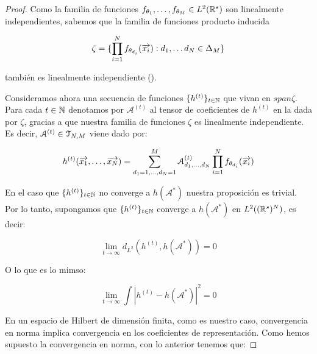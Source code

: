 \begin{proof}
    Como la familia de funciones $f_{\theta_1}, \ldots, f_{\theta_M} \in L^2(\mathbb{R}^s)$ son linealmente independientes, sabemos que la familia de funciones producto inducida

    \begin{equation}
        \zeta = \{ \prod_{i = 1}^N f_{\theta_{d_i}}(\overrightarrow{x_i}): d_1, \ldots d_N \in \Delta_{M} \}
    \end{equation}

    también es linealmente independiente ().

    Consideramos ahora una secuencia de funciones $\{ h^{(t)} \}_{t \in \mathbb{N}}$ que vivan en $span \zeta$. Para cada $t \in \mathbb{N}$ denotamos por $\mathcal{A}^{(t)}$ al tensor de coeficientes de $h^{(t)}$ en la  dada por $\zeta$, gracias a que nuestra familia de funciones $\zeta$ es linealmente independiente. Es decir, $\mathcal{A}^{(t)} \in \mathcal{T}_{N, M}$ viene dado por:


    \begin{equation}
        h^{(t)}(\overrightarrow{x_1}, \ldots, \overrightarrow{x_N}) = \sum_{d_1 = 1, \ldots, d_N = 1}^M \mathcal{A}^{(t)}_{d_1, \ldots, d_N} \prod_{i = 1}^N f_{\theta_{d_i}}(\overrightarrow{x_i})
    \end{equation}

    En el caso que $\{ h^{(t)} \}_{t \in \mathbb{N}}$ no converge a $h(\mathcal{A}^*)$ nuestra proposición es trivial. Por lo tanto, supongamos que $\{ h^{(t)} \}_{t \in \mathbb{N}}$ converge a $h(\mathcal{A}^*)$ en $L^2((\mathbb{R}^s)^N)$, es decir:

    \begin{equation}
        \lim_{t \to \infty} d_{L^2}(h^{(t)}, h(\mathcal{A}^*)) = 0
    \end{equation}

    O lo que es lo mimso:

    \begin{equation}
        \lim_{t \to \infty} \int | h^{(t)} - h(\mathcal{A}^*)|^2 = 0
    \end{equation}

    En un espacio de Hilbert de dimensión finita, como es nuestro caso, convergencia en norma implica convergencia en los coeficientes de representación. Como hemos supuesto la convergencia en norma, con lo anterior tenemos que:


\end{proof}
